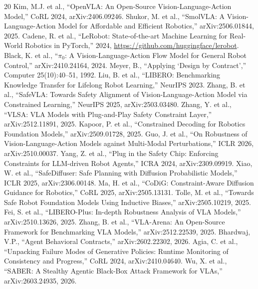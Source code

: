 \documentclass[conference]{IEEEtran}
\begin{document}
\begin{thebibliography}{20}
 Kim, M.J. et al., ``OpenVLA: An Open-Source Vision-Language-Action Model,'' CoRL 2024, arXiv:2406.09246.
 Shukor, M. et al., ``SmolVLA: A Vision-Language-Action Model for Affordable and Efficient Robotics,'' arXiv:2506.01844, 2025.
 Cadene, R. et al., ``LeRobot: State-of-the-art Machine Learning for Real-World Robotics in PyTorch,'' 2024, \url{https://github.com/huggingface/lerobot}.
 Black, K. et al., ``$\pi_0$: A Vision-Language-Action Flow Model for General Robot Control,'' arXiv:2410.24164, 2024.
 Meyer, B., ``Applying `Design by Contract','' Computer 25(10):40--51, 1992.
 Liu, B. et al., ``LIBERO: Benchmarking Knowledge Transfer for Lifelong Robot Learning,'' NeurIPS 2023.
 Zhang, B. et al., ``SafeVLA: Towards Safety Alignment of Vision-Language-Action Model via Constrained Learning,'' NeurIPS 2025, arXiv:2503.03480.
 Zhang, Y. et al., ``VLSA: VLA Models with Plug-and-Play Safety Constraint Layer,'' arXiv:2512.11891, 2025.
 Kapoor, P. et al., ``Constrained Decoding for Robotics Foundation Models,'' arXiv:2509.01728, 2025.
 Guo, J. et al., ``On Robustness of Vision-Language-Action Models against Multi-Modal Perturbations,'' ICLR 2026, arXiv:2510.00037.
 Yang, Z. et al., ``Plug in the Safety Chip: Enforcing Constraints for LLM-driven Robot Agents,'' ICRA 2024, arXiv:2309.09919.
 Xiao, W. et al., ``SafeDiffuser: Safe Planning with Diffusion Probabilistic Models,'' ICLR 2025, arXiv:2306.00148.
 Ma, H. et al., ``CoDiG: Constraint-Aware Diffusion Guidance for Robotics,'' CoRL 2025, arXiv:2505.13131.
 Tolle, M. et al., ``Towards Safe Robot Foundation Models Using Inductive Biases,'' arXiv:2505.10219, 2025.
 Fei, S. et al., ``LIBERO-Plus: In-depth Robustness Analysis of VLA Models,'' arXiv:2510.13626, 2025.
 Zhang, B. et al., ``VLA-Arena: An Open-Source Framework for Benchmarking VLA Models,'' arXiv:2512.22539, 2025.
 Bhardwaj, V.P., ``Agent Behavioral Contracts,'' arXiv:2602.22302, 2026.
 Agia, C. et al., ``Unpacking Failure Modes of Generative Policies: Runtime Monitoring of Consistency and Progress,'' CoRL 2024, arXiv:2410.04640.
 Wu, X. et al., ``SABER: A Stealthy Agentic Black-Box Attack Framework for VLAs,'' arXiv:2603.24935, 2026.
\end{thebibliography}
\end{document}
